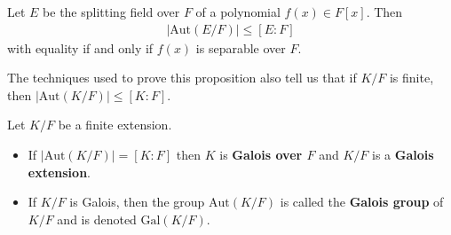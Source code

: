 \documentclass{memoir}
\begin{document}


\begin{prop}
	Let \(E\) be the splitting field over \(F\) of a polynomial \(f(x) \in F[x]\). Then
	\begin{align*}
		\left| \textrm{Aut}(E / F)\right|  \leq [E:F] 
	\end{align*}
	with equality if and only if \(f(x)\) is separable over \(F\).
\end{prop}
The techniques used to prove this proposition also tell us that if \(K / F\) is finite, then \(\left| \textrm{Aut}(K / F) \right| \leq [K:F]\).

\begin{defn}
	Let \(K / F\) be a finite extension.
	\begin{itemize}
		\item If \(\left| \textrm{Aut}(K / F) \right| = [K:F]\) then \(K\) is \textbf{Galois over \(F\)} and \(K / F\) is a \textbf{Galois extension}.
		\item If \(K / F\) is Galois, then the group \(\textrm{Aut}(K / F)\) is called the \textbf{Galois group} of \(K / F\) and is denoted \(\textrm{Gal}(K / F)\).
	\end{itemize}
\end{defn}
\end{document}
